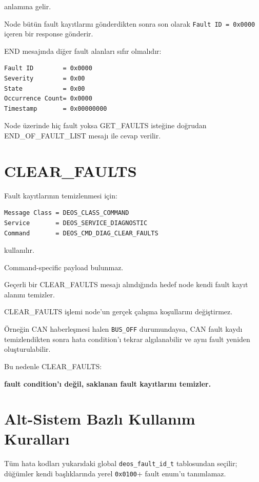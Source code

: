 \documentclass[a4paper,11pt]{article}
\newcommand{\hex}[1]{\texttt{0x#1}}
\newcommand{\code}[1]{\texttt{#1}}
\begin{document}
anlamına gelir.

Node bütün fault kayıtlarını gönderdikten sonra son olarak
\texttt{Fault ID = 0x0000} içeren bir response gönderir.

END mesajında diğer fault alanları sıfır olmalıdır:

\begin{lstlisting}
Fault ID        = 0x0000
Severity        = 0x00
State           = 0x00
Occurrence Count= 0x0000
Timestamp       = 0x00000000
\end{lstlisting}

Node üzerinde hiç fault yoksa GET\_FAULTS isteğine doğrudan
END\_OF\_FAULT\_LIST mesajı ile cevap verilir.

\section{CLEAR\_FAULTS}

Fault kayıtlarının temizlenmesi için:

\begin{lstlisting}
Message Class = DEOS_CLASS_COMMAND
Service       = DEOS_SERVICE_DIAGNOSTIC
Command       = DEOS_CMD_DIAG_CLEAR_FAULTS
\end{lstlisting}

kullanılır.

Command-specific payload bulunmaz.

Geçerli bir CLEAR\_FAULTS mesajı alındığında hedef node kendi fault
kayıt alanını temizler.

CLEAR\_FAULTS işlemi node'un gerçek çalışma koşullarını değiştirmez.

Örneğin CAN haberleşmesi halen \texttt{BUS\_OFF} durumundaysa,
CAN fault kaydı temizlendikten sonra hata condition'ı tekrar
algılanabilir ve aynı fault yeniden oluşturulabilir.

Bu nedenle CLEAR\_FAULTS:

\begin{center}
\textbf{fault condition'ı değil, saklanan fault kayıtlarını temizler.}
\end{center}

\section{Alt-Sistem Bazlı Kullanım Kuralları}

Tüm hata kodları yukarıdaki global \code{deos\_fault\_id\_t} tablosundan seçilir; düğümler kendi başlıklarında yerel \hex{0100}+ fault enum'u tanımlamaz.
\end{document}
